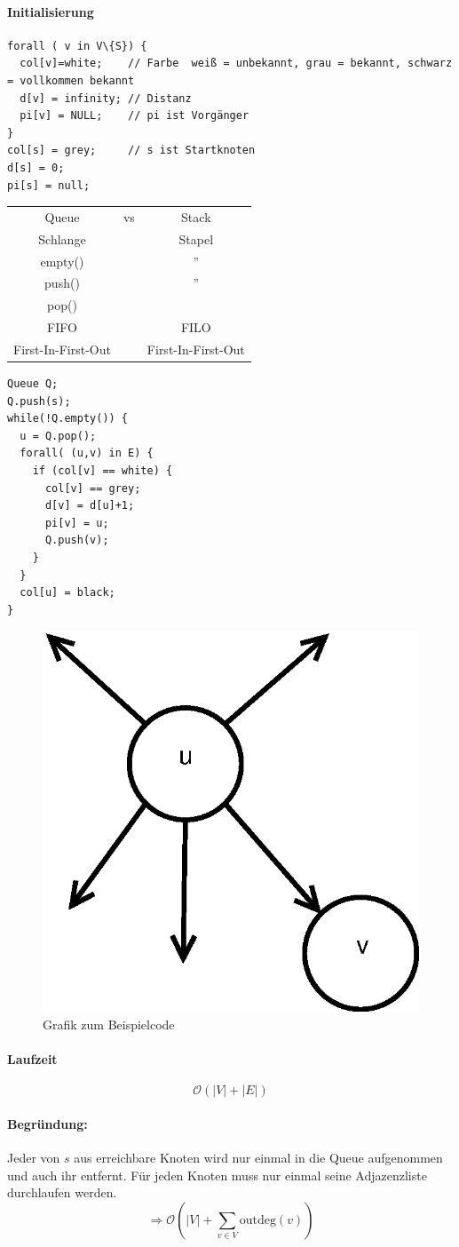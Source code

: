 \paragraph{Initialisierung}
\begin{lstlisting}
forall ( v in V\{S}) {
  col[v]=white;    // Farbe  weiß = unbekannt, grau = bekannt, schwarz = vollkommen bekannt
  d[v] = infinity; // Distanz
  pi[v] = NULL;    // pi ist Vorgänger
}
col[s] = grey;     // s ist Startknoten
d[s] = 0;
pi[s] = null;
\end{lstlisting}
\begin{tabular}{ccc}
	Queue & vs & Stack \\
	Schlange &$~$& Stapel \\
	empty() &$~$ & '' \\
	push() &$~$ & '' \\
	pop() &$~$ &  \\
	FIFO &$~$ & FILO \\
	First-In-First-Out &$~$& First-In-First-Out 
\end{tabular}
\begin{lstlisting}
Queue Q;
Q.push(s);
while(!Q.empty()) {
  u = Q.pop();
  forall( (u,v) in E) {
    if (col[v] == white) {
      col[v] == grey;
      d[v] = d[u]+1;
      pi[v] = u;
      Q.push(v);
    }
  }
  col[u] = black;
}
\end{lstlisting}
\begin{figure}[h]
\centering
\includegraphics[width=0.5\linewidth]{15/Grafik/CodeBild}
\caption{Grafik zum Beispielcode}
\label{fig:CodeBild}
\end{figure}
\paragraph{Laufzeit}
\[ \mathcal{O}(|V|+|E|) \]
\paragraph{Begründung:}
Jeder von $s$ aus erreichbare Knoten wird nur einmal in die Queue aufgenommen und auch ihr entfernt. Für jeden Knoten muss nur einmal seine Adjazenzliste durchlaufen werden.
\[  \Rightarrow \mathcal{O}\left(|V|+\sum_{v \in V}\text{outdeg}(v) \right) \]